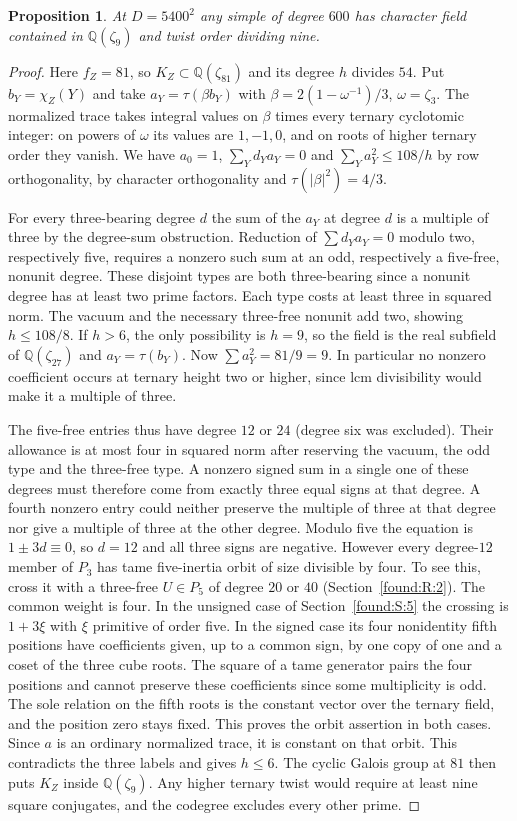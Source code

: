 \documentclass[11pt,a4paper]{article}
\numberwithin{equation}{section}
\newtheorem{proposition}[theorem]{Proposition}
\theoremstyle{remark}
\newcommand{\QQ}{\mathbb Q}
\begin{document}
\begin{proposition}\label{por:field600}
At $D=5400^2$ any simple of degree $600$ has character field contained in $\QQ(\zeta_9)$ and twist order dividing nine.
\end{proposition}
\begin{proof}
Here $f_Z=81$, so $K_Z\subset\QQ(\zeta_{81})$ and its degree $h$ divides $54$. Put $b_Y=\chi_Z(Y)$ and take $a_Y=\tau(\beta b_Y)$ with $\beta=2(1-\omega^{-1})/3$, $\omega=\zeta_3$. The normalized trace takes integral values on $\beta$ times every ternary cyclotomic integer: on powers of $\omega$ its values are $1,-1,0$, and on roots of higher ternary order they vanish. We have $a_0=1$, $\sum_Y d_Ya_Y=0$ and $\sum_Y a_Y^2\le108/h$ by row orthogonality, by character orthogonality and $\tau(|\beta|^2)=4/3$.

For every three-bearing degree $d$ the sum of the $a_Y$ at degree $d$ is a multiple of three by the degree-sum obstruction. Reduction of $\sum d_Ya_Y=0$ modulo two, respectively five, requires a nonzero such sum at an odd, respectively a five-free, nonunit degree. These disjoint types are both three-bearing since a nonunit degree has at least two prime factors. Each type costs at least three in squared norm. The vacuum and the necessary three-free nonunit add two, showing $h\le 108/8$. If $h>6$, the only possibility is $h=9$, so the field is the real subfield of $\QQ(\zeta_{27})$ and $a_Y=\tau(b_Y)$. Now $\sum a_Y^2=81/9=9$. In particular no nonzero coefficient occurs at ternary height two or higher, since lcm divisibility would make it a multiple of three.

The five-free entries thus have degree $12$ or $24$ (degree six was excluded). Their allowance is at most four in squared norm after reserving the vacuum, the odd type and the three-free type. A nonzero signed sum in a single one of these degrees must therefore come from exactly three equal signs at that degree. A fourth nonzero entry could neither preserve the multiple of three at that degree nor give a multiple of three at the other degree. Modulo five the equation is $1\pm3d\equiv0$, so $d=12$ and all three signs are negative. However every degree-$12$ member of $P_3$ has tame five-inertia orbit of size divisible by four. To see this, cross it with a three-free $U\in P_5$ of degree $20$ or $40$ (Section~\ref{found:R:2}). The common weight is four. In the unsigned case of Section~\ref{found:S:5} the crossing is $1+3\xi$ with $\xi$ primitive of order five. In the signed case its four nonidentity fifth positions have coefficients given, up to a common sign, by one copy of one and a coset of the three cube roots. The square of a tame generator pairs the four positions and cannot preserve these coefficients since some multiplicity is odd. The sole relation on the fifth roots is the constant vector over the ternary field, and the position zero stays fixed. This proves the orbit assertion in both cases. Since $a$ is an ordinary normalized trace, it is constant on that orbit. This contradicts the three labels and gives $h\le6$. The cyclic Galois group at $81$ then puts $K_Z$ inside $\QQ(\zeta_9)$. Any higher ternary twist would require at least nine square conjugates, and the codegree excludes every other prime.
\end{proof}
\end{document}
